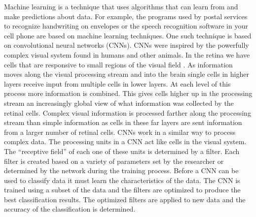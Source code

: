 Machine learning is a technique that uses algorithms that can learn from and make predictions about data.
For example, the programs used by postal services to recognize handwriting on envelopes or the speech recognition software in your cell phone are based on machine learning techniques.
One such technique is based on convolutional neural networks (\acp{CNN}).
\acp{CNN} were inspired by the powerfully complex visual system found in humans and other animals.
In the retina we have cells that are responsive to small regions of the visual field \cite{hubel_receptive_1963}. 
As information moves along the visual processing stream and into the brain single cells in higher layers receive input from multiple cells in lower layers.
At each level of this process more information is combined.
This gives cells higher up in the processing stream an increasingly global view of what information was collected by the retinal cells.
Complex visual information is processed farther along the processing stream than simple information as cells in these far layers are sent information from a larger number of retinal cells.
\acp{CNN} work in a similar way to process complex data. 
The processing units in a \ac{CNN} act like cells in the visual system.
The ``receptive field'' of each one of these units is determined by a filter.
Each filter is created based on a variety of parameters set by the researcher or determined by the network during the training process.
Before a \ac{CNN} can be used to classify data it must learn the characteristics of the data. 
The \ac{CNN} is trained using a subset of the data and the filters are optimized to produce the best classification results. 
The optimized filters are applied to new data and the accuracy of the classification is determined. 

